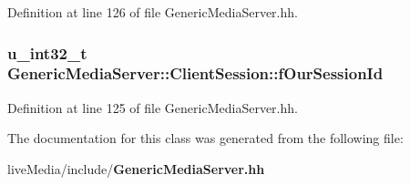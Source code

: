 Definition at line 126 of file Generic\+Media\+Server.\+hh.

\subsubsection[{f\+Our\+Session\+Id}]{\setlength{\rightskip}{0pt plus 5cm}u\+\_\+int32\+\_\+t Generic\+Media\+Server\+::\+Client\+Session\+::f\+Our\+Session\+Id\hspace{0.3cm}{\ttfamily [protected]}}\label{classGenericMediaServer_1_1ClientSession_a1e024d0ccd488dfb64282c686180efbf}


Definition at line 125 of file Generic\+Media\+Server.\+hh.



The documentation for this class was generated from the following file\+:\begin{DoxyCompactItemize}
\item 
live\+Media/include/{\bf Generic\+Media\+Server.\+hh}\end{DoxyCompactItemize}
